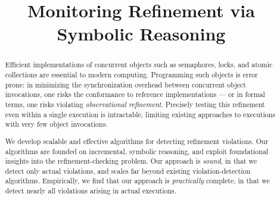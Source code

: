\documentclass[pldi,10pt,nocopyrightspace]{sigplanconf}
\title{Monitoring Refinement via Symbolic Reasoning}
\begin{document}
  \maketitle

  \begin{abstract}

    Efficient implementations of concurrent objects such as semaphores, locks,
    and atomic collections are essential to modern computing. Programming such
    objects is error prone: in minimizing the synchronization overhead between
    concurrent object invocations, one risks the conformance to reference
    implementations --- or in formal terms, one risks violating
    \emph{observational refinement}. Precisely testing this refinement even
    within a single execution is intractable, limiting existing approaches to
    executions with very few object invocations.

    We develop scalable and effective algorithms for detecting refinement
    violations. Our algorithms are founded on incremental, symbolic reasoning,
    and exploit foundational insights into the refinement-checking problem. Our
    approach is \emph{sound}, in that we detect only actual violations, and
    scales far beyond existing violation-detection algorithms. Empirically, we
    find that our approach is \emph{practically} complete, in that we detect
    nearly all violations arising in actual executions.

  \end{abstract}

  
  
  
  
  
  
  
  
  
  
\end{document}
